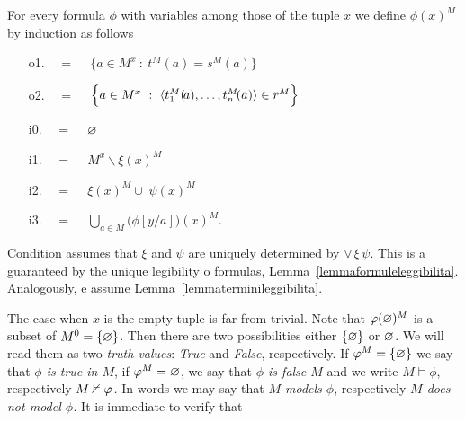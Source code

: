 \begin{definition}[ of truth]\label{defverita} For every formula $\phi$ with variables among those of the tuple $x$ we define \emph{$\phi(x)^M$\/} by induction as follows
\begin{itemize}
\item[o1.] \hspace*{15ex}\ \  =\ \ \  $\Big\{a\in M^{x}\ :\ t^M\!(a)=s^M\!(a) \Big\}$\medskip

\item[o2.] \hspace*{15ex}\ \   =\ \ \ $\Big\{a\in M^{x}\ :\ \<t_1^M(\!a),\dots,t_n^M\!(a)\>\in r^M\Big\}$\medskip

\item[i0.] \hspace*{15ex}\ \  =\ \ \  $\varnothing$\bigskip

\item[i1.] \hspace*{15ex}\ \   =\ \ \  $M^{x}\smallsetminus\xi(x)^M$\bigskip

\item[i2.] \hspace*{15ex}\ \   =\ \ \  $\xi(x)^M\cup\;\psi(x)^M$\bigskip

\item[i3.] \hspace*{15ex}\ \   =\ \ \ $\displaystyle\bigcup_{a\in M}\big(\phi[y/a]\big)(x)^M$.
\end{itemize}
Condition  assumes that $\xi$ and $\psi$ are uniquely determined by $\vee\,\xi\,\psi$. This is a guaranteed by the unique legibility o formulas, Lemma~\ref{lemmaformuleleggibilita}.
Analogously,  e  assume Lemma~\ref{lemmaterminileggibilita}.
\end{definition}

The case when $x$ is the empty tuple is far from trivial. Note that $\varphi(\varnothing)^M$ is a subset of $M^0=\{\varnothing\}$. Then there are two possibilities either $\{\varnothing\}$ or $\varnothing$.
We will read them as two \emph{truth values}: \emph{True\/} and \emph{False}, respectively. If $\varphi^M=\{\varnothing\}$ we say that \emph{$\phi$ is true in $M$}, if $\varphi^M=\varnothing$, we say that \emph{$\phi$ is false $M$} and we write \emph{$M\models\phi$}, respectively \emph{$M\nvDash\varphi$.}
In words we may say that \emph{$M$ models $\phi$}, respectively \emph{$M$ does not model $\phi$.}
It is immediate to verify that


